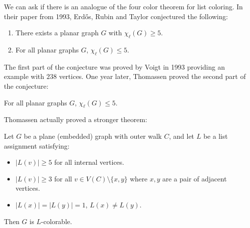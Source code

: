 We can ask if there is an analogue of the four color theorem for list coloring.
In their paper from 1993, Erdős, Rubin and Taylor conjectured the following:

\begin{conjecture}
\begin{enumerate}
	\item There exists a planar graph $G$ with $\chi_{\ell}(G) \geq 5$. 
	\item For all planar graphs $G$, $\chi_{\ell}(G) \leq 5$.
\end{enumerate}
\end{conjecture}

The first part of the conjecture was proved by Voigt \cite{voigt1993} in 1993 providing an 
example with $238$ vertices. One year later, Thomassen proved the second part of the conjecture:

\begin{theorem}
\label{thomassentheorem}
For all planar graphs $G$, $\chi_{\ell}(G) \leq 5$.
\end{theorem}

Thomassen actually proved a stronger theorem: 

\begin{theorem}
\label{thomassenstrongertheorem}
	Let $G$ be a plane (embedded) graph with outer walk $C$, and let $L$ be a list assignment satisfying:
\begin{itemize}
	\item $|L(v)| \geq 5$ for all internal vertices.
	\item $|L(v)| \geq 3$ for all $v \in V(C) \setminus \{x, y\}$ where $x, y$ are a pair of adjacent vertices.
	\item $|L(x)| = |L(y)| = 1$, $L(x) \neq L(y)$. 
\end{itemize}	
	Then $G$ is $L$-colorable.
\end{theorem}

